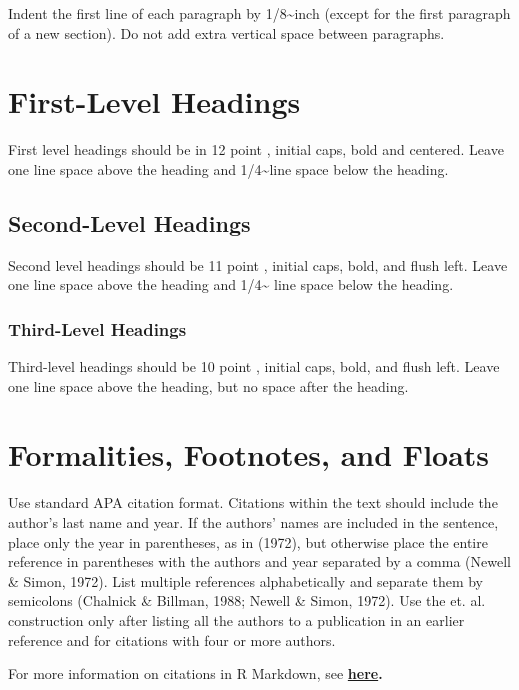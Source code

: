 \documentclass[10pt, letterpaper]{article}
\begin{document}
Indent the first line of each paragraph by 1/8\textasciitilde{}inch
(except for the first paragraph of a new section). Do not add extra
vertical space between paragraphs.

\section{First-Level Headings}\label{first-level-headings}

First level headings should be in 12 point , initial caps, bold and
centered. Leave one line space above the heading and
1/4\textasciitilde{}line space below the heading.

\subsection{Second-Level Headings}\label{second-level-headings}

Second level headings should be 11 point , initial caps, bold, and flush
left. Leave one line space above the heading and 1/4\textasciitilde{}
line space below the heading.

\subsubsection{Third-Level Headings}\label{third-level-headings}

Third-level headings should be 10 point , initial caps, bold, and flush
left. Leave one line space above the heading, but no space after the
heading.

\section{Formalities, Footnotes, and
Floats}\label{formalities-footnotes-and-floats}

Use standard APA citation format. Citations within the text should
include the author's last name and year. If the authors' names are
included in the sentence, place only the year in parentheses, as in
(1972), but otherwise place the entire reference in parentheses with the
authors and year separated by a comma (Newell \& Simon, 1972). List
multiple references alphabetically and separate them by semicolons
(Chalnick \& Billman, 1988; Newell \& Simon, 1972). Use the et. al.
construction only after listing all the authors to a publication in an
earlier reference and for citations with four or more authors.

For more information on citations in R Markdown, see
\textbf{\href{http://rmarkdown.rstudio.com/authoring_bibliographies_and_citations.html\#citations}{here}.}
\end{document}
